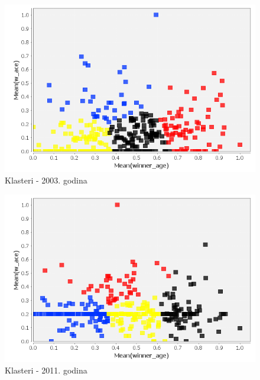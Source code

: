 \documentclass[a4paper]{article}
\begin{document}
\begin{figure}[H]
	\begin{center}
		\includegraphics[width=1\textwidth]{Klasterovanje/ScatterPlot_KMeans2003.png}
	\end{center}
	\caption{Klasteri - 2003. godina}
	\label{fig:KNIME_ScatterPlot2003}
\end{figure}
\begin{figure}[H]
	\begin{center}
		\includegraphics[width=1\textwidth]{Klasterovanje/ScatterPlot_KMeans2011.png}
	\end{center}
	\caption{Klasteri - 2011. godina}
	\label{fig:KNIME_ScatterPlot2011}
\end{figure}
\end{document}
